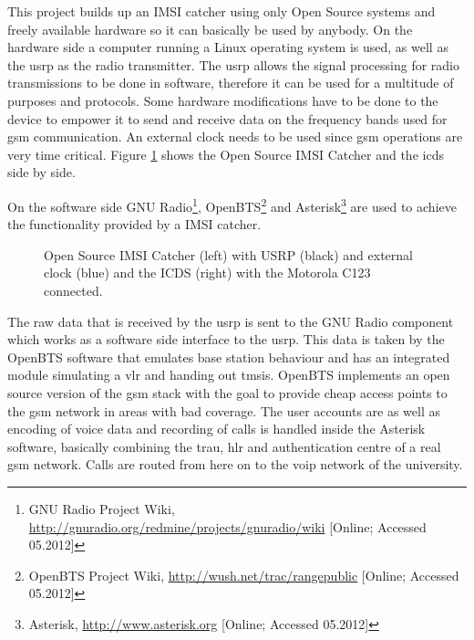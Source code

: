 This project builds up an IMSI catcher using only Open Source systems and freely available hardware so it can basically be used by anybody.
On the hardware side a computer running a Linux operating system is used, as well as the \gls{usrp} as the radio transmitter.
The \gls{usrp} allows the signal processing for radio transmissions to be done in software, therefore it can be used for a multitude of purposes and protocols.
Some hardware modifications have to be done to the device to empower it to send and receive data on the frequency bands used for \gls{gsm} communication.
An external clock needs to be used since \gls{gsm} operations are very time critical.
Figure \ref{fig:setup} shows the Open Source IMSI Catcher and the \gls{icds} side by side.

On the software side GNU Radio\footnote{GNU Radio Project Wiki, \url{http://gnuradio.org/redmine/projects/gnuradio/wiki} [Online; Accessed 05.2012]}, OpenBTS\footnote{OpenBTS Project Wiki, \url{http://wush.net/trac/rangepublic} [Online; Accessed 05.2012]} and Asterisk\footnote{Asterisk, \url{http://www.asterisk.org} [Online; Accessed 05.2012]} are used to achieve the functionality provided by a IMSI catcher.
\begin{figure}
\caption{Open Source IMSI Catcher (left) with USRP (black) and external clock (blue) and the ICDS (right) with the Motorola C123 connected.}
\label{fig:setup}
\end{figure}
The raw data that is received by the \gls{usrp} is sent to the GNU Radio component which works as a software side interface to the \gls{usrp}.
This data is taken by the OpenBTS software that emulates base station behaviour and has an integrated module simulating a \gls{vlr} and handing out \glspl{tmsi}.
OpenBTS implements an open source version of the \gls{gsm} stack with the goal to provide cheap access points to the \gls{gsm} network in areas with bad coverage.
The user accounts are as well as encoding of voice data and recording of calls is handled inside the Asterisk software, basically combining the \gls{trau}, \gls{hlr} and authentication centre of a real \gls{gsm} network.
Calls are routed from here on to the \gls{voip} network of the university.

